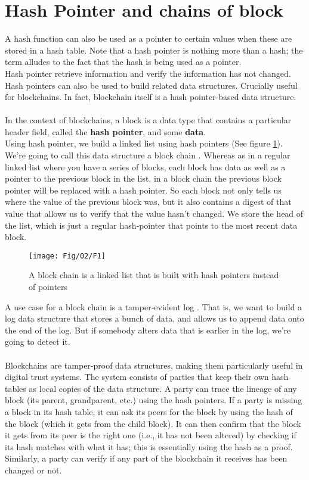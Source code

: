\section{Hash Pointer and chains of block}
A hash function can also be used as a pointer to certain values when these are stored in a hash table. Note that a hash pointer is nothing more than a hash; the term alludes to the fact that the hash is being used as a pointer.\\
Hash pointer retrieve information and verify the information has not changed. Hash pointers can also be used to build related data structures. Crucially useful for blockchains. In fact, blockchain itself is a hash pointer-based data structure. \\\\
In the context of blockchains, a block is a data type that contains a particular header field, called the \textbf{hash pointer}, and some \textbf{data}.\\
Using hash pointer, we build a linked list using hash pointers (See figure \ref{fig:l2_f1}). We’re going to call this data structure a block chain . Whereas as in a regular linked list where you have a series of blocks, each block has data as well as a pointer to the previous block in the list, in a block chain the previous block pointer will be replaced with a hash pointer. So each block not only tells us where the value of the previous block was, but it also contains a digest of that value that allows us to verify that the value hasn’t changed. We store the head of the list, which is just a regular hash‐pointer that points to the most recent data block.
\begin{center}
	\begin{figure}
		\centering
		\texttt{[image: Fig/02/F1]}
		\caption{A block chain is a linked list that is built with hash pointers instead of pointers}
		\label{fig:l2_f1}
	\end{figure}
\end{center}
A use case for a block chain is a tamper‐evident log . That is, we want to build a log data structure that stores a bunch of data, and allows us to append data onto the end of the log. But if somebody alters data that is earlier in the log, we’re going to detect it.\\\\
Blockchains are tamper-proof data structures, making them particularly useful in digital trust systems. The system consists of parties that keep their own hash tables as local copies of the data structure. A party can trace the lineage of any block (its parent, grandparent, etc.) using the hash pointers. If a party is missing a block in its hash table, it can ask its peers for the block by using the hash of the block (which it gets from the child block). It can then confirm that the block it gets from its peer is the right one (i.e., it has not been altered) by checking if its hash matches with what it has; this is essentially using the hash as a proof. Similarly, a party can verify if any part of the blockchain it receives has been changed or not.\\
